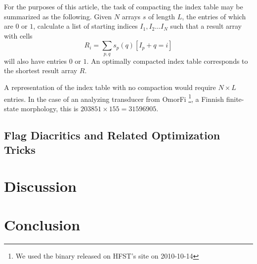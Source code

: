 \documentclass{llncs}
\begin{document}
For the purposes of this article, the task of compacting the index table may
be summarized as the following. Given $N$ arrays $s$ of length $L$, the
entries of which are $0$ or $1$, calculate a list of starting indices
$I_1, I_2 \ldots I_N$ such that a result array with cells
\begin{equation}
R_i = \displaystyle\sum\limits_{p, q} s_p(q) [I_p + q = i]
\end{equation} will also have
entries $0$ or $1$. An optimally compacted index table corresponds to the
shortest result array $R$.

A representation of the index table with no compaction would require
$N \times L$ entries. In the case of an analyzing transducer from OmorFi
\footnote{We used the binary released on HFST's site on 2010-10-14}, a
Finnish finite-state morphology, this is $203851 \times 155 = 31596905$.



\subsection{Flag Diacritics and Related Optimization Tricks}\label{flag-diacritics}

\section{Discussion}

\section{Conclusion}

%
%
%



\end{document}
